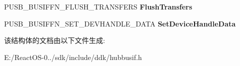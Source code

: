 \begin{DoxyCompactItemize}
\item 
\mbox{\label{struct___u_s_b___b_u_s___i_n_t_e_r_f_a_c_e___h_u_b___v5_a31b85e1d70af666f619a97dd7e7c977b}} 
P\+U\+S\+B\+\_\+\+B\+U\+S\+I\+F\+F\+N\+\_\+\+F\+L\+U\+S\+H\+\_\+\+T\+R\+A\+N\+S\+F\+E\+RS {\bfseries Flush\+Transfers}
\item 
\mbox{\label{struct___u_s_b___b_u_s___i_n_t_e_r_f_a_c_e___h_u_b___v5_a6aa084aa34ce333bde927c22e6b11f9a}} 
P\+U\+S\+B\+\_\+\+B\+U\+S\+I\+F\+F\+N\+\_\+\+S\+E\+T\+\_\+\+D\+E\+V\+H\+A\+N\+D\+L\+E\+\_\+\+D\+A\+TA {\bfseries Set\+Device\+Handle\+Data}
\end{DoxyCompactItemize}


该结构体的文档由以下文件生成\+:\begin{DoxyCompactItemize}
\item 
E\+:/\+React\+O\+S-\/0../sdk/include/ddk/hubbusif.\+h\end{DoxyCompactItemize}
